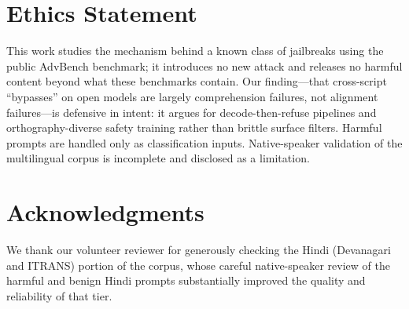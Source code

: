 \documentclass[11pt]{article}
\begin{document}
\section*{Ethics Statement}
This work studies the mechanism behind a known class of jailbreaks using the public AdvBench benchmark; it introduces no new attack and releases no harmful content beyond what these benchmarks contain. Our finding---that cross-script ``bypasses'' on open models are largely comprehension failures, not alignment failures---is defensive in intent: it argues for decode-then-refuse pipelines and orthography-diverse safety training rather than brittle surface filters. Harmful prompts are handled only as classification inputs. Native-speaker validation of the multilingual corpus is incomplete and disclosed as a limitation.

\section*{Acknowledgments}
We thank our volunteer reviewer for generously checking the Hindi (Devanagari and ITRANS) portion of the corpus, whose careful native-speaker review of the harmful and benign Hindi prompts substantially improved the quality and reliability of that tier.



\appendix
\end{document}

